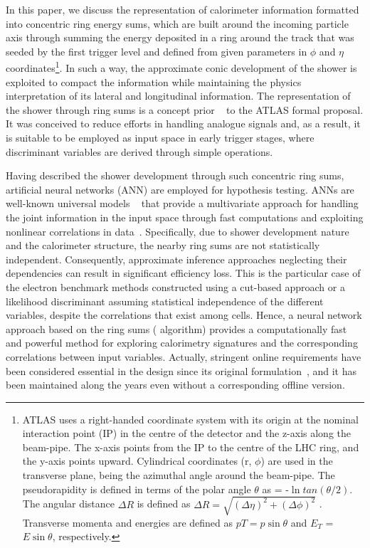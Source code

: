 In this paper, we discuss the representation of calorimeter information formatted into concentric ring energy sums, which are built around the incoming particle axis through summing the energy deposited in a ring around the track that was seeded by the first trigger level and defined from given parameters in $\phi$ and $\eta$ coordinates\footnote{ATLAS uses a right-handed coordinate system with its origin at the nominal interaction point (IP) in the centre of the detector and the z-axis along the beam-pipe. The x-axis points from the IP to the centre of the LHC ring, and the y-axis points upward. Cylindrical coordinates (r, $\phi$) are used in the transverse plane, \phi being the azimuthal angle around the beam-pipe. The pseudorapidity is defined in terms of the polar angle $\theta$ as \eta = -$\ln{tan(\theta/2)}$. The angular distance $\Delta R$ is defined as $\Delta R = \sqrt{(\Delta\eta)^{2} + (\Delta\phi)^{2}}$ . Transverse momenta and energies are defined as $pT = p\sin\theta$ and $E_{T}$ = $E\sin\theta$, respectively.}. In such a way, the approximate conic development of the shower is exploited to compact the information while maintaining the physics interpretation of its lateral and longitudinal information. The representation of the shower through ring sums is a concept prior ~\cite{1992_spacal_rings} to the ATLAS formal proposal. It was conceived to reduce efforts in handling analogue signals and, as a result, it is suitable to be employed as input space in early trigger stages, where discriminant variables are derived through simple operations.


Having described the shower development through such concentric ring sums,  artificial neural networks (ANN) are employed for hypothesis testing.  ANNs are well-known universal models ~\cite{haykin_2008} that provide a multivariate approach for handling the joint information in the input space through fast computations and exploiting nonlinear correlations in data~\cite{Duda}. Specifically, due to shower development nature and the calorimeter structure, the nearby ring sums are not statistically independent. Consequently, approximate inference approaches neglecting their dependencies can result in significant efficiency loss. This is the particular case of the electron benchmark methods constructed using a cut-based approach or a likelihood discriminant assuming statistical independence of the different variables, despite the correlations that exist among cells.  Hence, a neural network approach based on the ring sums (\rnn{} algorithm) provides a computationally fast and powerful method for exploring calorimetry signatures and the corresponding correlations between input variables. Actually, stringent online requirements have been considered essential in the \rnn{} design since its original formulation~\cite{1995_seixas_ringer}, and it has been maintained along the years even without a corresponding offline version.

